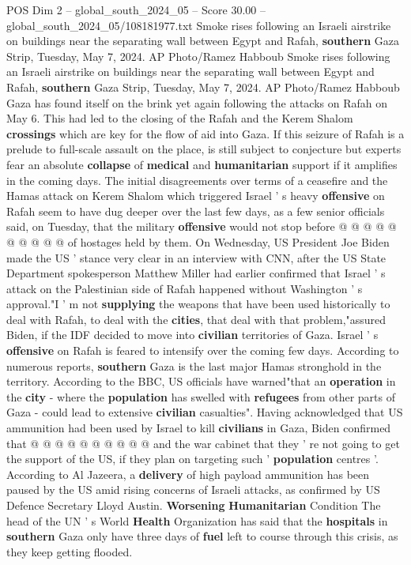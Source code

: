 \begin{textsample}{POS Dim 2 – global\_south\_2024\_05 – Score 30.00 – global\_south\_2024\_05/108181977.txt}  \label{ex:f2_pos_075}
Smoke rises following an Israeli airstrike on buildings near the separating wall between Egypt and Rafah, \textbf{southern} Gaza Strip, Tuesday, May 7, 2024.
AP Photo/Ramez Habboub Smoke rises following an Israeli airstrike on buildings near the separating wall between Egypt and Rafah, \textbf{southern} Gaza Strip, Tuesday, May 7, 2024.
AP Photo/Ramez Habboub Gaza has found itself on the brink yet again following the attacks on Rafah on May 6.
This had led to the closing of the Rafah and the Kerem Shalom \textbf{crossings} which are key for the flow of aid into Gaza.
If this seizure of Rafah is a prelude to full-scale assault on the place, is still subject to conjecture but experts fear an absolute \textbf{collapse} of \textbf{medical} and \textbf{humanitarian} support if it amplifies in the coming days.
The initial disagreements over terms of a ceasefire and the Hamas attack on Kerem Shalom which triggered Israel ' s heavy \textbf{offensive} on Rafah seem to have dug deeper over the last few days, as a few senior officials said, on Tuesday, that the military \textbf{offensive} would not stop before @ @ @ @ @ @ @ @ @ @ of hostages held by them.
On Wednesday, US President Joe Biden made the US ' stance very clear in an interview with CNN, after the US State Department spokesperson Matthew Miller had earlier confirmed that Israel ' s attack on the Palestinian side of Rafah happened without Washington ' s approval."I ' m not \textbf{supplying} the weapons that have been used historically to deal with Rafah, to deal with the \textbf{cities}, that deal with that problem,"assured Biden, if the IDF decided to move into \textbf{civilian} territories of Gaza.
Israel ' s \textbf{offensive} on Rafah is feared to intensify over the coming few days.
According to numerous reports, \textbf{southern} Gaza is the last major Hamas stronghold in the territory.
According to the BBC, US officials have warned"that an \textbf{operation} in the \textbf{city} - where the \textbf{population} has swelled with \textbf{refugees} from other parts of Gaza - could lead to extensive \textbf{civilian} casualties".
Having acknowledged that US ammunition had been used by Israel to kill \textbf{civilians} in Gaza, Biden confirmed that @ @ @ @ @ @ @ @ @ @ and the war cabinet that they ' re not going to get the support of the US, if they plan on targeting such ' \textbf{population} centres '.
According to Al Jazeera, a \textbf{delivery} of high payload ammunition has been paused by the US amid rising concerns of Israeli attacks, as confirmed by US Defence Secretary Lloyd Austin. \textbf{Worsening} \textbf{Humanitarian} Condition The head of the UN ' s World \textbf{Health} Organization has said that the \textbf{hospitals} in \textbf{southern} Gaza only have three days of \textbf{fuel} left to course through this crisis, as they keep getting flooded.

\end{textsample}
